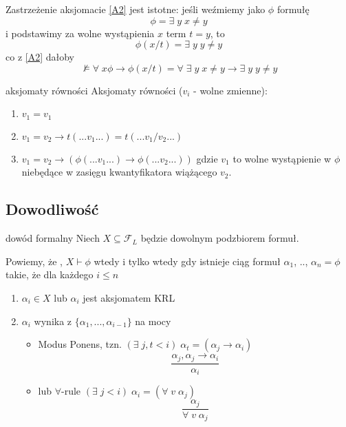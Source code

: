 Zastrzeżenie aksjomacie \ref{A2} jest istotne: jeśli weźmiemy jako $\phi$ formułę 
$$\phi = \exists\;y\;x\neq y$$ 
i podstawimy za wolne wystąpienia $x$ term $t=y$, to 
$$\phi(x/t)=\exists\;y\;y\neq y$$ 
co z \ref{A2} dałoby
$$\not\models\forall\;x\phi\to\phi(x/t)=\forall\;\exists\;y\;x\neq y\to \exists\;y\;y\neq y$$

\begin{definition}{aksjomaty równości}{}
{Aksjomaty równości} ($v_i$ - wolne zmienne):
\begin{enumerate}[label=\textbf{\color{orange}(R\arabic*)},ref=\color{orange!60!black}R\arabic*]
  \item\label{R1} $v_1=v_1$
  \item\label{R2} $v_1=v_2\to t(...v_1...)=t(...v_1/v_2...)$ 
  \item\label{R3} $v_1=v_2\to (\phi(...v_1...)\to \phi(...v_2...))$ gdzie $v_1$ to wolne wystąpienie w $\phi$ niebędące w zasięgu kwantyfikatora wiążącego $v_2$.
\end{enumerate}
\end{definition}

\subsection{Dowodliwość}
 
\begin{definition}{dowód formalny}{}
  Niech $X\subseteq\mathcal{F}_L$ będzie dowolnym podzbiorem formuł. 

  Powiemy, że , 
  $X\vdash \phi$ wtedy i tylko wtedy gdy istnieje ciąg formuł  $\alpha_1$, .., $\alpha_n=\phi$ takie, że dla każdego $i\leq n$
  \begin{enumerate}
    \item $\alpha_i\in X$ lub $\alpha_i$ jest aksjomatem KRL
    \item $\alpha_i$ wynika z $\{\alpha_1,...,\alpha_{i-1}\}$ na mocy 
      \begin{itemize}
        \item Modus Ponens, tzn. $(\exists\;j,t<i)\;\alpha_t=(\alpha_j\to \alpha_i)$
          $$\frac{\alpha_j,\alpha_j\to\alpha_i}{\alpha_i}$$
        \item lub $\forall$-rule $(\exists\;j<i)\;\alpha_i=(\forall\;v\;\alpha_j)$
          $$\frac{\alpha_j}{\forall\;v\;\alpha_j}$$
      \end{itemize}
  \end{enumerate}
\end{definition}

